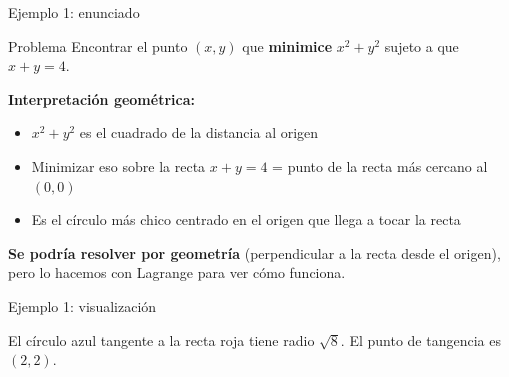 \documentclass{beamer}
\begin{document}

\begin{frame}{Ejemplo 1: enunciado}
    \small
    \begin{alertblock}{Problema}
        Encontrar el punto $(x, y)$ que \textbf{minimice} $x^2 + y^2$ sujeto a que $x + y = 4$.
    \end{alertblock}

    \vspace{0.8em}

    \textbf{Interpretación geométrica:}
    \begin{itemize}
        \item $x^2 + y^2$ es el cuadrado de la distancia al origen
        \item Minimizar eso sobre la recta $x + y = 4$ = punto de la recta más cercano al $(0,0)$
        \item Es el círculo más chico centrado en el origen que llega a tocar la recta
    \end{itemize}

    \vspace{0.5em}

    \textbf{Se podría resolver por geometría} (perpendicular a la recta desde el origen), pero lo hacemos con Lagrange para ver cómo funciona.
\end{frame}

\begin{frame}{Ejemplo 1: visualización}
    \small
    \begin{center}
    \end{center}

    El círculo azul tangente a la recta roja tiene radio $\sqrt{8}$. El punto de tangencia es $(2, 2)$.
\end{frame}
\end{document}
